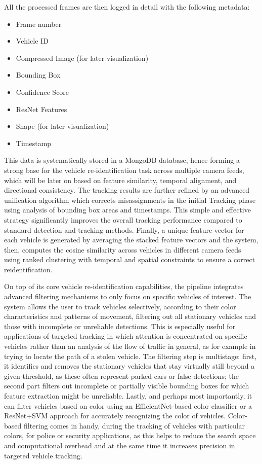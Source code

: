 All the processed frames are then logged in detail with the following metadata:
\begin{itemize}
    \item Frame number
    \item Vehicle ID
    \item Compressed Image (for later visualization)
    \item Bounding Box
    \item Confidence Score
    \item ResNet Features
    \item Shape (for later visualization)
    \item Timestamp
\end{itemize}

This data is systematically stored in a MongoDB database, hence forming a strong base for the vehicle re-identification task across multiple camera feeds, which will be later on based on feature similarity, temporal alignment, and directional consistency. The tracking results are further refined by an advanced unification algorithm which corrects misassignments in the initial Tracking phase using analysis of bounding box areas and timestamps. This simple and effective strategy significantly improves the overall tracking performance compared to standard detection and tracking methods. Finally, a unique feature vector for each vehicle is generated by averaging the stacked feature vectors and the system, then, computes the cosine similarity across vehicles in different camera feeds using ranked clustering with temporal and spatial constraints to ensure a correct reidentification.

On top of its core vehicle re-identification capabilities, the pipeline integrates advanced filtering mechanisms to only focus on specific vehicles of interest. The system allows the user to track vehicles selectively, according to their color characteristics and patterns of movement, filtering out all stationary vehicles and those with incomplete or unreliable detections. This is especially useful for applications of targeted tracking in which attention is concentrated on specific vehicles rather than an analysis of the flow of traffic in general, as for example in trying to locate the path of a stolen vehicle. The filtering step is multistage: first, it identifies and removes the stationary vehicles that stay virtually still beyond a given threshold, as these often represent parked cars or false detections; the second part filters out incomplete or partially visible bounding boxes for which feature extraction might be unreliable. Lastly, and perhaps most importantly, it can filter vehicles based on color using an EfficientNet-based color classifier or a ResNet+SVM approach for accurately recognizing the color of vehicles. Color-based filtering comes in handy, during the tracking of vehicles with particular colors, for police or security applications, as this helps to reduce the search space and computational overhead and at the same time it increases precision in targeted vehicle tracking.

